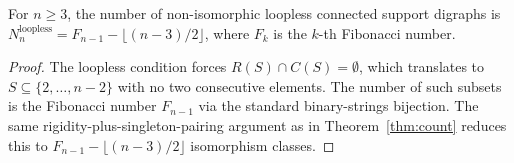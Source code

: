 \begin{theorem}\label{thm:count_loopless}
  \leanok
  For $n \ge 3$, the number of non-isomorphic loopless connected
  support digraphs is
  $N_n^{\mathrm{loopless}} = F_{n-1} - \lfloor (n-3)/2 \rfloor$,
  where $F_k$ is the $k$-th Fibonacci number.
\end{theorem}
\begin{proof}\leanok{}
  The loopless condition forces $R(S) \cap C(S) = \emptyset$, which
  translates to $S \subseteq \{2, \dots, n-2\}$ with no two consecutive
  elements. The number of such subsets is the Fibonacci number
  $F_{n-1}$ via the standard binary-strings bijection. The same
  rigidity-plus-singleton-pairing argument as in Theorem~\ref{thm:count}
  reduces this to $F_{n-1} - \lfloor (n-3)/2 \rfloor$ isomorphism
  classes.
\end{proof}
